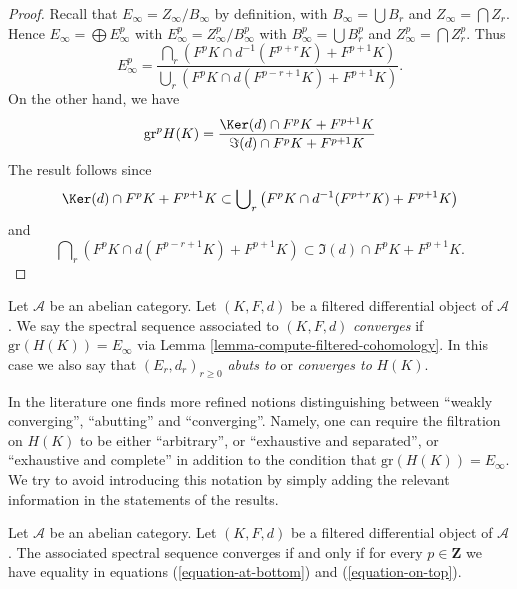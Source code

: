 \begin{proof}
Recall that $E_\infty = Z_\infty/B_\infty$ by definition, with
$B_\infty = \bigcup B_r$ and $Z_\infty = \bigcap Z_r$. Hence
$E_\infty = \bigoplus E_\infty^p$ with $E_\infty^p = Z_\infty^p/B_\infty^p$
with $B_\infty^p = \bigcup B_r^p$ and $Z_\infty^p = \bigcap Z_r^p$. Thus
$$
E_\infty^p =
\frac{\bigcap_r (F^pK \cap d^{-1}(F^{p + r}K) + F^{p + 1}K)}
{\bigcup_r (F^pK \cap d(F^{p - r + 1}K) + F^{p + 1}K)}.
$$
On the other hand, we have
$$
\text{gr}^p H(K) =
\frac{\Ker(d) \cap F^pK + F^{p + 1}K}
{\Im(d) \cap F^pK + F^{p + 1}K}
$$
The result follows since
\begin{equation}
\label{equation-on-top}
\Ker(d) \cap F^pK + F^{p + 1}K
\subset
\bigcup\nolimits_r \left(F^pK \cap d^{-1}(F^{p + r}K) + F^{p + 1}K\right)
\end{equation}
and
\begin{equation}
\label{equation-at-bottom}
\bigcap\nolimits_r \left(F^pK \cap d(F^{p - r + 1}K) + F^{p + 1}K\right)
\subset
\Im(d) \cap F^pK + F^{p + 1}K.
\end{equation}
\end{proof}

\begin{definition}
\label{definition-filtered-differential-ss-converges}
Let $\mathcal{A}$ be an abelian category.
Let $(K, F, d)$ be a filtered differential object of $\mathcal{A}$.
We say the spectral sequence associated to $(K, F, d)$
{\it converges} if $\text{gr}(H(K)) = E_{\infty}$ via
Lemma \ref{lemma-compute-filtered-cohomology}.
In this case we also say that $(E_r, d_r)_{r \geq 0}$ {\it abuts to}
or {\it converges to} $H(K)$.
\end{definition}

\noindent
In the literature one finds more refined notions distinguishing between
``weakly converging'', ``abutting'' and ``converging''. Namely, one can
require the filtration on $H(K)$ to be either ``arbitrary'', or
``exhaustive and separated'', or ``exhaustive and complete'' in addition
to the condition that $\text{gr}(H(K)) = E_\infty$. We try to avoid introducing
this notation by simply adding the relevant information in the statements
of the results.

\begin{lemma}
\label{lemma-filtered-differential-ss-converges}
Let $\mathcal{A}$ be an abelian category.
Let $(K, F, d)$ be a filtered differential object of $\mathcal{A}$.
The associated spectral sequence converges if and only if for every
$p \in \mathbf{Z}$ we have equality in equations
(\ref{equation-at-bottom}) and (\ref{equation-on-top}).
\end{lemma}

